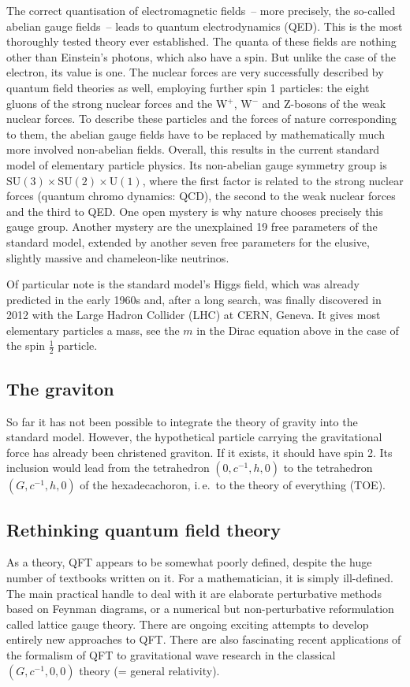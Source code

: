 The correct quantisation of electromagnetic fields~-- more precisely, the so-called abelian gauge fields~-- leads to quantum electrodynamics (QED). This is the most thoroughly tested theory ever established. The quanta of these fields are nothing other than Einstein's photons, which also have a spin. But unlike the case of the electron, its value is one. The nuclear forces are very successfully described by quantum field theories as well, employing further spin 1 particles: the eight gluons of the strong nuclear forces and the W$^+$, W$^-$ and Z-bosons of the weak nuclear forces. To describe these particles and the forces of nature corresponding to them, the abelian gauge fields have to be replaced by mathematically much more involved non-abelian fields. Overall, this results in the current standard model of elementary particle physics. Its non-abelian gauge symmetry group is $\mathrm{SU}(3) \times \mathrm{SU}(2) \times \mathrm{U}(1)$, where the first factor is related to the strong nuclear forces (quantum chromo dynamics: QCD), the second to the weak nuclear forces and the third to QED. One open mystery is why nature chooses precisely this gauge group. Another mystery are the unexplained 19 free parameters of the standard model, extended by another seven free parameters for the elusive, slightly massive and chameleon-like neutrinos.

Of particular note is the standard model's Higgs field, which was already predicted in the early 1960s and, after a long search, was finally discovered in 2012 with the Large Hadron Collider (LHC) at CERN, Geneva. It gives most elementary particles a mass, see the $m$ in the Dirac equation above in the case of the spin $\frac12$ particle.


\subsection*{The graviton}

So far it has not been possible to integrate the theory of gravity into the standard model. However, the hypothetical particle carrying the gravitational force has already been christened graviton. If it exists, it should have spin 2. Its inclusion would lead from the tetrahedron $(0, c^{-1},h,0)$ to the tetrahedron $(G,c^{-1},h,0)$ of the hexadecachoron, i.\,e.\ to the theory of everything (TOE).


\subsection*{Rethinking quantum field theory}

As a theory, QFT appears to be somewhat poorly defined, despite the huge number of textbooks written on it. For a mathematician, it is simply ill-defined. The main practical handle to deal with it are elaborate perturbative methods based on Feynman diagrams, or a numerical but non-perturbative reformulation called lattice gauge theory. There are ongoing exciting attempts to develop entirely new approaches to QFT. There are also fascinating recent applications of the formalism of QFT to gravitational wave research in the classical $(G,c^{-1},0,0)$ theory (= general relativity).
